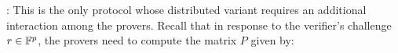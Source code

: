 
: This is the only protocol whose distributed variant requires an additional interaction among the provers. Recall that in response to the verifier’s challenge $r\in \mathbb{F}^p$, the provers need to compute the matrix $P$ given by:

